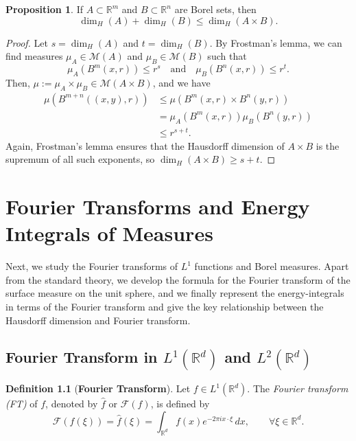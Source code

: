 \documentclass[12pt,a4paper]{report}
\theoremstyle{definition}
\newtheorem{proposition}{Proposition}
\newtheorem{definition}{Definition}
\begin{document}
\begin{proposition} \label{prop1.24}
If \( A \subset \mathbb{R}^m \) and \( B \subset \mathbb{R}^n \) are Borel sets, then
\[
\dim_H(A) + \dim_H(B) \le \dim_H(A \times B).
\]
\end{proposition}

\begin{proof}
Let \( s = \dim_H(A) \) and \( t = \dim_H(B) \). By Frostman’s lemma, we can find measures \( \mu_A \in \mathcal{M}(A) \) and \( \mu_B \in \mathcal{M}(B) \) such that
\[
\mu_A(B^m(x, r)) \le r^s \quad \text{and} \quad \mu_B(B^n(x, r)) \le r^t.
\]
Then, \( \mu := \mu_A \times \mu_B \in \mathcal{M}(A \times B) \), and we have
\[
\begin{aligned}
\mu(B^{m+n}((x,y), r))
&\le \mu(B^m(x, r) \times B^n(y, r)) \\
&= \mu_A(B^m(x, r)) \mu_B(B^n(y, r)) \\
&\le r^{s + t}.
\end{aligned}
\]
Again, Frostman's lemma ensures that the Hausdorff dimension of $A \times B$ is the supremum of all such exponents, so $\dim_H(A \times B) \geq s+t$.
\end{proof}


\chapter{Fourier Transforms and Energy Integrals of Measures}
Next, we study the Fourier transforms of $L^1$ functions and Borel measures. Apart from the standard theory, we develop the formula for the Fourier transform of the surface measure on the unit sphere, and we finally represent the energy-integrals in terms of the Fourier transform and give the key relationship between the Hausdorff dimension and Fourier transform.

\section{Fourier Transform in \texorpdfstring{$L^1(\mathbb{R}^d)$ and $L^2(\mathbb{R}^d)$}{L1(Rd) and L2(Rd)}}


\begin{definition}[\textbf{Fourier Transform}]
Let \( f \in L^1(\mathbb{R}^d) \). The \emph{Fourier transform (FT)} of \( f \), denoted by \( \widehat{f} \) or \( \mathcal{F}(f) \), is defined by
\[
\mathcal{F}(f(\xi))= \widehat{f}(\xi)=\int_{\mathbb{R}^d} f(x) e^{-2\pi i x \cdot \xi} \, dx, \qquad \forall\xi \in \mathbb{R}^d.
\]
\end{definition}
\end{document}
